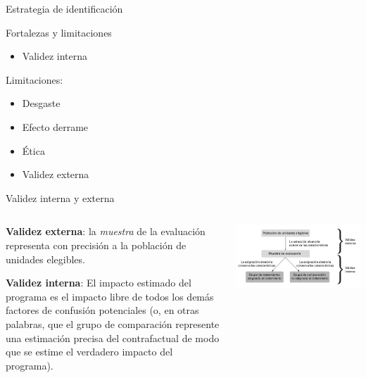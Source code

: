 \documentclass[
  ignorenonframetext,
]{beamer}
\providecommand{\tightlist}{%
  \setlength{\itemsep}{0pt}\setlength{\parskip}{0pt}}
\begin{document}
\begin{frame}{Estrategia de identificación}
\begin{frame}{Fortalezas y limitaciones}
\begin{itemize}
\tightlist
\item
  Validez interna
\end{itemize}

Limitaciones:

\begin{itemize}
\tightlist
\item
  Desgaste
\item
  Efecto derrame
\item
  Ética
\item
  Validez externa
\end{itemize}
\end{frame}

\begin{frame}{Validez interna y externa}
\protect\hypertarget{validez-interna-y-externa}{}
\begin{columns}
\begin{column}{0.4\textwidth}

\begin{scriptsize}
\textbf{Validez externa}: la \textit{muestra} de la evaluación representa con precisión a la población de unidades elegibles.

\vspace{16pt}


\textbf{Validez interna}: El impacto estimado del programa es el impacto libre de todos los demás factores de confusión potenciales (o, en otras palabras, que el grupo de comparación represente una estimación precisa del contrafactual de modo que se estime el verdadero impacto del programa).

\end{scriptsize}

\end{column}
\begin{column}{0.6\textwidth}


\includegraphics[width=1\textwidth]{figs/vive.png}


\end{column}
\end{columns}
\end{frame}
\end{frame}
\end{document}
